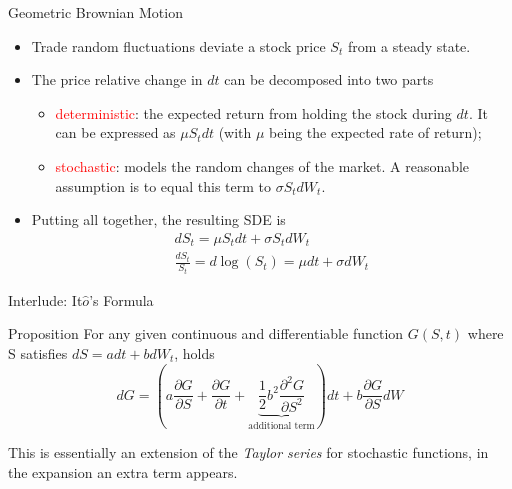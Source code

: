 \documentclass{beamer}
\begin{document}
\begin{frame}{Geometric Brownian Motion}
	\begin{itemize}
		\item Trade random fluctuations deviate a stock price $S_t$ from a steady state.
		\item The price relative change in $dt$ can be decomposed into two parts
		\begin{itemize}
			\item \textcolor{red}{deterministic}: the expected return from holding the stock during $dt$. It can be expressed as $\mu S_tdt$ (with $\mu$ being the expected rate of return);
			\item \textcolor{red}{stochastic}: models the random changes of the market. A reasonable assumption is to equal this term to $\sigma S_t dW_t$. 
		\end{itemize}
		\item Putting all together, the resulting SDE is
		\begin{equation}
			\begin{gathered}
				dS_t = \mu S_t dt + \sigma S_t dW_t \\
				\frac{dS_t}{S_t} = d\log(S_t) = \mu dt + \sigma dW_t
			\end{gathered}
			\label{eq:log_normal_sde}
		\end{equation}
	\end{itemize}
\end{frame}

\begin{frame}{Interlude: It$\hat{o}$'s Formula}
	\begin{block}{Proposition}
		For any given continuous and differentiable function $G(S,t)$ where S satisfies $dS=adt + bdW_t$, holds
		\begin{equation}
			dG = \left(a\frac{\partial G}{\partial S} + \frac{\partial G}{\partial t} + \underbrace{\frac{1}{2}b^2\frac{\partial^2 G}{\partial S^2}}_{\text{additional term}}\right)dt + b\frac{\partial G}{\partial S} dW
			\label{eq:itos_lemma}
		\end{equation}

	This is essentially an extension of the \emph{Taylor series} for stochastic functions, in the expansion an extra term appears.	
	\end{block}	
\end{frame}
\end{document}
